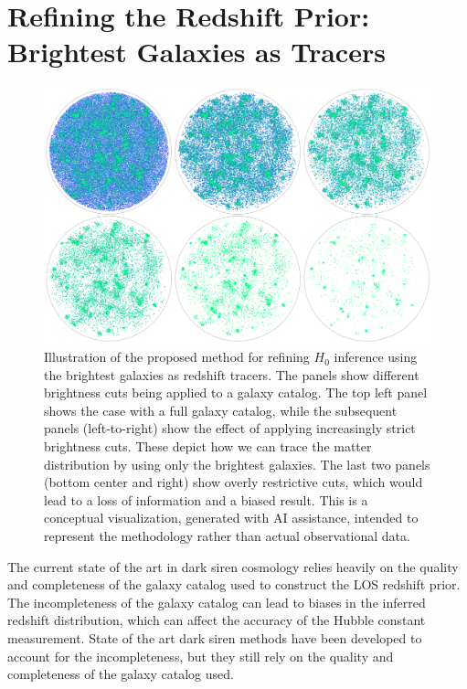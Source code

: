 \section{Refining the Redshift Prior: Brightest Galaxies as Tracers}
\begin{figure}[h!]
    \centering
    \includegraphics[width=\textwidth]{figures/depict7.png}
    \caption[Illustration of the proposed method, using bright galaxies as redshift tracers.]{Illustration of the proposed method for refining $H_0$ inference using the brightest galaxies as redshift tracers. The panels show different brightness cuts being applied to a galaxy catalog. The top left panel shows the case with a full galaxy catalog, while the subsequent panels (left-to-right) show the effect of applying increasingly strict brightness cuts. These depict how we can trace the matter distribution by using only the brightest galaxies. The last two panels (bottom center and right) show overly restrictive cuts, which would lead to a loss of information and a biased result. This is a conceptual visualization, generated with AI assistance, intended to represent the methodology rather than actual observational data.}
    \label{fig:depict}
\end{figure}

The current state of the art in dark siren cosmology relies heavily on the quality and completeness of the galaxy catalog used to construct the \ac{LOS} redshift prior. 
The incompleteness of the galaxy catalog can lead to biases in the inferred redshift distribution, which can affect the accuracy of the Hubble constant measurement. State of the art dark siren methods have been developed to account for the incompleteness, but they still rely on the quality and completeness of the galaxy catalog used.


